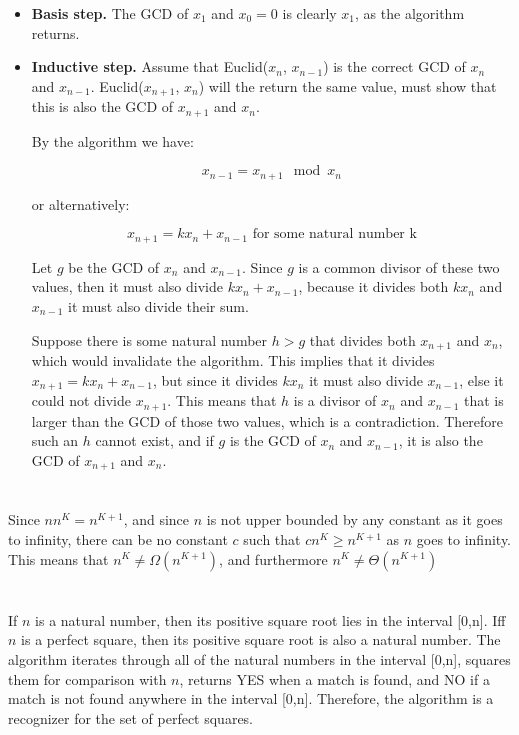 \documentclass{article}
\begin{document}
\begin{itemize}

\item{\textbf{Basis step.}}
The GCD of $x_1$ and $x_0 = 0$ is clearly $x_1$, as the algorithm returns.

\item{\textbf{Inductive step.}}
Assume that Euclid($x_n$, $x_{n-1}$) is the correct GCD of $x_n$ and $x_{n-1}$.
Euclid($x_{n+1}$, $x_n$) will the return the same value, must show that this
is also the GCD of $x_{n+1}$ and $x_n$. 

By the algorithm we have:

\[
x_{n-1} = x_{n+1} \mod x_n
\]

or alternatively:

\[
x_{n+1} = kx_n + x_{n-1} \text{ for some natural number k}
\]

Let $g$ be the GCD of $x_n$ and
$x_{n-1}$. Since $g$ is a common divisor of these two values, then it must
also divide $kx_n + x_{n-1}$, because it divides both $kx_n$ and $x_{n-1}$ it
must also divide their sum. 

\vspace{1em}

Suppose there is some natural number $h>g$ that divides both $x_{n+1}$ and
$x_n$,
which would invalidate the algorithm. This implies that it divides
$x_{n+1} = kx_n + x_{n-1}$, but since it divides $kx_n$ it must also divide
$x_{n-1}$,
else it could not divide $x_{n+1}$. This means that $h$ is a divisor of $x_n$
and $x_{n-1}$ that is larger than the GCD of those two values, which is a
contradiction. Therefore such an $h$ cannot exist, and if $g$ is the GCD of
$x_n$ and $x_{n-1}$, it is also the GCD of $x_{n+1}$ and $x_n$.

\end{itemize}

\section{}
Since $nn^K = n^{K+1}$, and since $n$ is not upper bounded by any
constant as it goes to infinity, there can be no constant $c$ such that
$cn^K \ge n^{K+1}$ as $n$ goes
to infinity. This means that $n^K \ne \Omega(n^{K+1})$, and furthermore
$n^K \ne \Theta(n^{K+1})$

\section{}
If $n$ is a natural number, then its positive square root lies in the interval
[0,n]. Iff $n$ is a perfect square, then its positive square root is also a
natural number.
The algorithm iterates through all of the natural numbers in the 
interval [0,n], squares them for comparison with $n$, returns YES when a match
is found, and NO if a match is not found anywhere in the interval [0,n].
Therefore, the algorithm is a recognizer for the set of perfect squares.
\end{document}

